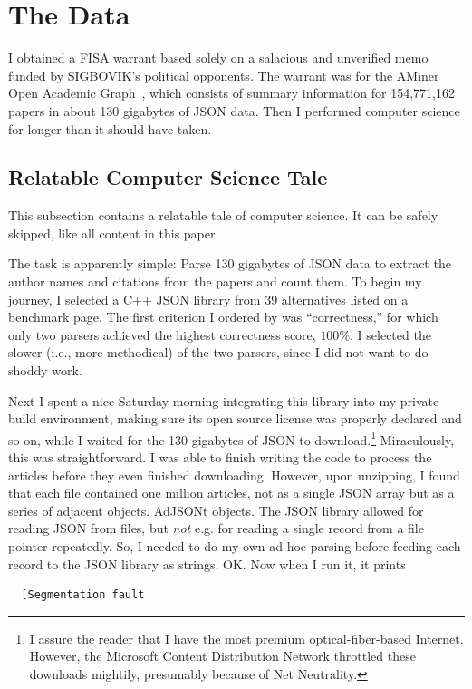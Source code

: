 \documentclass[twocolumn]{article}
\begin{document}
\section{The Data}

I obtained a FISA warrant based solely on a salacious and unverified
memo funded by SIGBOVIK's political opponents. The warrant was for the
AMiner Open Academic Graph~\cite{Tang08ArnetMiner}, which consists of
summary information for 154,771,162 papers in about 130 gigabytes of
JSON data. Then I performed computer science for longer than it should
have taken.


\subsection{Relatable Computer Science Tale}

This subsection contains a relatable tale of computer science. It can
be safely skipped, like all content in this paper.

\smallskip
The task is apparently simple: Parse 130 gigabytes of JSON data to
extract the author names and citations from the papers and count them.
To begin my journey, I selected a C++ JSON library from 39
alternatives listed on a benchmark page.\cite{yip2018native} The first
criterion I ordered by was ``correctness,'' for which only two parsers
achieved the highest correctness score, $100\%$. I selected the slower
(i.e., more methodical) of the two parsers, since I did not want to do
shoddy work.

Next I spent a nice Saturday morning integrating this library into my
private build environment, making sure its open source license was
properly declared and so on, while I waited for the 130 gigabytes of
JSON to download.\footnote{I assure the reader that I have the most
  premium optical-fiber-based Internet. However, the Microsoft Content
  Distribution Network throttled these downloads mightily, presumably
  because of Net Neutrality.} Miraculously, this was straightforward.
I was able to finish writing the code to process the articles before
they even finished downloading. However, upon unzipping, I found that
each file contained one million articles, not as a single JSON array
but as a series of adjacent objects. AdJSONt objects. The JSON library
allowed for reading JSON from files, but {\em not} e.g. for reading a
single record from a file pointer repeatedly. So, I needed to do my
own ad hoc parsing before feeding each record to the JSON library as
strings. OK. Now when I run it, it prints
\begin{verbatim}
  [Segmentation fault
\end{verbatim}
\end{document}
